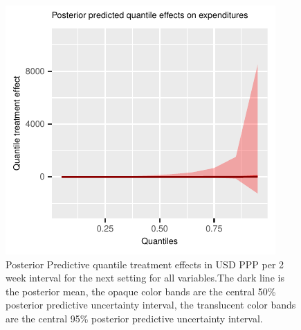 \documentclass[english,12pt]{article}\usepackage{lmodern}
\numberwithin{equation}{section}
\begin{document}
\begin{figure}[h!]
        \includegraphics[scale=0.4]{posterior_predicted_quantile_TEs_expenditures_lognormal.pdf}
  \caption{ Posterior Predictive quantile treatment effects in USD PPP per 2 week interval for the next setting for all variables.The dark line is the posterior mean, the opaque color bands are the central 50\% posterior predictive uncertainty interval, the translucent color bands are the central 95\% posterior predictive uncertainty interval.}\label{posterior predicted quantiles}
\end{figure}

\clearpage
\end{document}
